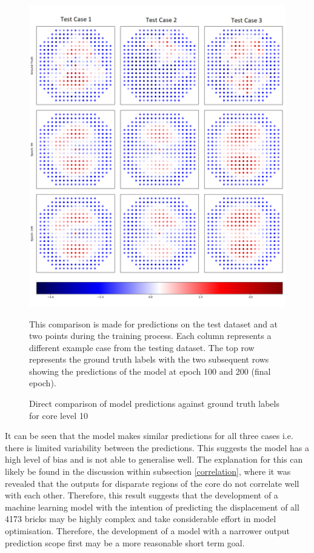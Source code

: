 \begin{figure}[p]
	\centering
	\includegraphics[scale=0.45]{Figures/preds_layer_10.png}
	\caption{Direct comparison of model predictions against ground truth labels for core level 10} {This comparison is made for predictions on the test dataset and at two points during the training process. Each column represents a different example case from the testing dataset. The top row represents the ground truth labels with the two subsequent rows showing the predictions of the model at epoch 100 and 200 (final epoch). }
	\label{fig:preds_layer_10}
\end{figure}

\noindent
It can be seen that the model makes similar predictions for all three cases i.e. there is limited variability between the predictions. This suggests the model has a high level of bias and is not able to generalise well. The explanation for this can likely be found in the discussion within subsection \ref{correlation}, where it was revealed that the outputs for disparate regions of the core do not correlate well with each other. Therefore, this result suggests that the development of a machine learning model with the intention of predicting the displacement of all 4173 bricks may be highly complex and take considerable effort in model optimisation. Therefore, the development of a model with a narrower output prediction scope first may be a more reasonable short term goal.

